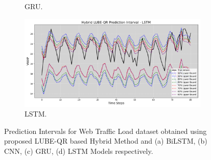 \begin{figure}[H]
\begin{minipage}{0.50\textwidth}
\begin{subfigure}[b]{\textwidth}
                \caption{GRU.}
            \end{subfigure}
            \begin{subfigure}[b]{\textwidth}
                \centering
                \includegraphics[width=\textwidth]{Chap03/figs/Hybrid_LUBE_QR_AllConfidence_web_traffic_LSTM.png}
                \caption{LSTM.}
            \end{subfigure}
        \end{minipage}
    
    \caption{Prediction Intervals for Web Traffic Load dataset obtained using proposed LUBE-QR based Hybrid Method and (a) BiLSTM, (b) CNN, (c) GRU, (d) LSTM Models respectively.}
    \label{fig 5.5}
\end{figure}
\clearpage


